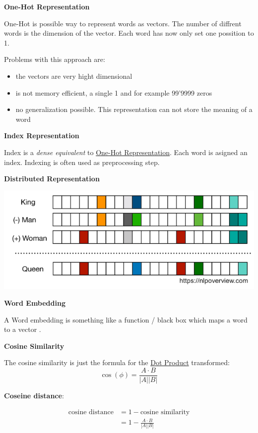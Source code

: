 \documentclass[11pt,landscape]{article}
\begin{document}
\begin{multicols}{3}
\textbf{One-Hot Representation}

One-Hot is possible way to represent words as vectors.
The number of diffrent words is the dimension of the vector.
Each word has now only set one possition to 1.

Problems with this approach are:
\begin{itemize}
\item the vectors are very hight dimensional
\item is not memory efficient, a single 1 and for example 99'9999 zeros
\item no generalization possible. This representation can not store the meaning of a word
\end{itemize}


\textbf{Index Representation}

Index is a \emph{dense equivalent} to \href{../../../roam/20211004181318-one_hot_representation.org}{One-Hot Representation}.
Each word is asigned an index.
Indexing is often used as preprocessing step.


\textbf{Distributed Representation}

\begin{center}
\includegraphics[width=.9\linewidth]{img/distributed_representation.png}
\end{center}


\textbf{Word Embedding}

A Word embedding is something like a function / black box which maps a word to a vector .


\textbf{Cosine Similarity}

The cosine similarity is just the formula for the \href{../../../roam/20211004182731-dot_product.org}{Dot Product} transformed:
$$
\cos(\phi) = \frac{A \cdot B}{|A||B|}
$$

\textbf{Coseine distance}:

\begin{align}
\text{cosine distance} &= 1 - \text{cosine similarity} \\
&= 1 - \frac{A \cdot B}{|A||B|}
\end{align}


\end{multicols}
\end{document}
